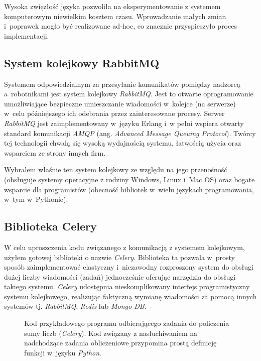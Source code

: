 \documentclass[../thesis.tex]{subfiles}
\begin{document}
Wysoka zwięzłość języka pozwoliła na eksperymentowanie z systemem komputerowym niewielkim kosztem czasu. Wprowadzanie małych zmian i~poprawek mogło być realizowane ad-hoc, co znacznie przyspieszyło proces implementacji.

\subsection{System kolejkowy RabbitMQ}

Systemem odpowiedzialnym za przesyłanie komunikatów pomiędzy nadzorcą a~robotnikami jest system kolejkowy \emph{RabbitMQ}. Jest to otwarte oprogramowanie umożliwiające bezpieczne umieszczanie wiadomości w~kolejce (na serwerze) w~celu późniejszego ich odebrania przez zainteresowane procesy. Serwer \emph{RabbitMQ} jest zaimplementowany w~języku Erlang i~w pełni wspiera otwarty standard komunikacji \emph{AMQP} (ang. \emph{Advanced Message Queuing Protocol}). Twórcy tej technologii chwalą się wysoką wydajnością systemu, łatwością użycia oraz wsparciem ze strony innych firm.

Wybrałem właśnie ten system kolejkowy ze względu na jego przenośność (obsługuje systemy operacyjne z rodziny Windows, Linux i~Mac OS) oraz bogate wsparcie dla programistów (obecność bibliotek w~wielu językach programowania, w~tym w~Pythonie).

\subsection{Biblioteka Celery}

W celu uproszczenia kodu związanego z komunikacją z systemem kolejkowym, użyłem gotowej biblioteki o nazwie \emph{Celery}. Biblioteka ta pozwala w~prosty sposób zaimplementować elastyczny i~niezawodny rozproszony system do obsługi dużej liczby wiadomości (zadań) jednocześnie oferując narzędzia do obsługi takiego systemu. \emph{Celery} udostępnia nieskomplikowany interfejs programistyczny systemu kolejkowego, realizując faktyczną wymianę wiadomości za pomocą innych systemów tj. \emph{RabbitMQ}, \emph{Redis} lub \emph{Mongo DB}. 

\begin{figure}[h]
\centering
{}

\caption{Kod przykładowego programu odbierającego zadania do policzenia sumy liczb (\emph{Celery}). Kod związany z nasłuchiwaniem na nadchodzące zadania obliczeniowe przypomina prostą definicję funkcji w~języku \emph{Python}.}
\label{impl:snippet_celery}
\end{figure}
\end{document}
